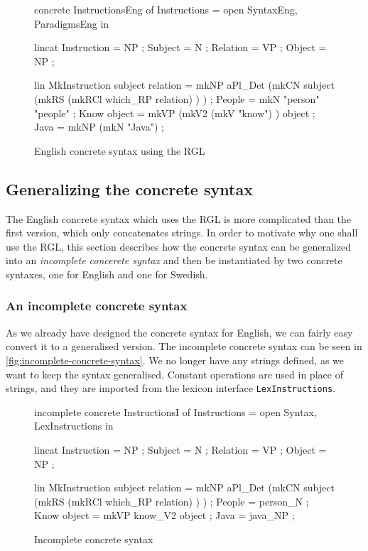 \begin{figure}[h]
\begin{code}
concrete InstructionsEng of Instructions = open SyntaxEng, ParadigmsEng in {
  lincat
    Instruction = NP ;
    Subject = N ;
    Relation = VP ;
    Object = NP ;

  lin
    MkInstruction subject relation = mkNP aPl_Det 
                                        (mkCN subject 
                                            (mkRS 
                                                (mkRCl which_RP relation)
                                            )
                                        ) ;
    People = mkN "person" "people" ;
    Know object = mkVP 
                    (mkV2 
                        (mkV "know")
                    ) object ;
    Java = mkNP (mkN "Java") ;
}
\end{code}
\caption{English concrete syntax using the RGL\label{fig:english-RGL}}
\end{figure}

\subsection{Generalizing the concrete syntax}

The English concrete syntax which uses the \ac{RGL} is more complicated than the first version, which only concatenates strings. In order to motivate why one shall use the RGL, this section describes how the concrete syntax can be generalized into an \emph{incomplete concerete syntax} and then be instantiated by two concrete syntaxes, one for English and one for Swedish.

\subsubsection*{An incomplete concrete syntax}

As we already have designed the concrete syntax for English, we can fairly easy convert it to a generalised version. The incomplete concrete syntax can be seen in \autoref{fig:incomplete-concrete-syntax}. We no longer have any strings defined, as we want to keep the syntax generalised. Constant operations are used in place of strings, and they are imported from the lexicon interface  \texttt{LexInstructions}.

\begin{figure}[h]
\begin{code}
incomplete concrete InstructionsI of Instructions = open Syntax, LexInstructions in {
    lincat
      Instruction = NP ;
      Subject = N ;
      Relation = VP ;
      Object = NP ;

    lin
      MkInstruction subject relation = mkNP aPl_Det 
                                        (mkCN subject 
                                            (mkRS 
                                                (mkRCl which_RP relation)
                                            )
                                        ) ;
      People = person_N ;
      Know object = mkVP know_V2 object ;
      Java = java_NP ;
}
\end{code}
\caption{Incomplete concrete syntax\label{fig:incomplete-concrete-syntax}}
\end{figure}

